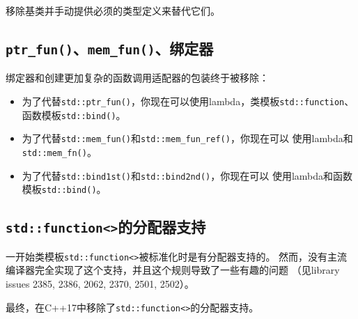 移除基类并手动提供必须的类型定义来替代它们。

\subsection{\texttt{ptr\_fun()}、\texttt{mem\_fun()}、绑定器}
绑定器和创建更加复杂的函数调用适配器的包装终于被移除：
\begin{itemize}
    \item 为了代替\texttt{std::ptr\_fun()}，你现在可以使用lambda，类模板\texttt{std::function}、
    函数模板\texttt{std::bind()}。
    \item 为了代替\texttt{std::mem\_fun()}和\texttt{std::mem\_fun\_ref()}，你现在可以
    使用lambda和\texttt{std::mem\_fn()}。
    \item 为了代替\texttt{std::bind1st()}和\texttt{std::bind2nd()}，你现在可以
    使用lambda和函数模板\texttt{std::bind()}。
\end{itemize}

\subsection{\texttt{std::function<>}的分配器支持}
一开始类模板\texttt{std::function<>}被标准化时是有分配器支持的。
然而，没有主流编译器完全实现了这个支持，并且这个规则导致了一些有趣的问题
（见library issues 2385, 2386, 2062, 2370, 2501, 2502）。

最终，在C++17中移除了\texttt{std::function<>}的分配器支持。

